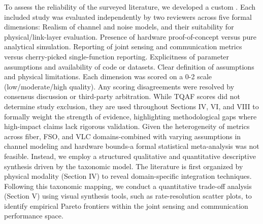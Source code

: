 {}
\markdownRendererSectionEnd \markdownRendererSectionBegin
{}\markdownRendererInterblockSeparator
{}To assess the reliability of the surveyed literature, we developed a custom . Each included study was evaluated independently by two reviewers across five formal dimensions:\markdownRendererInterblockSeparator
{}\markdownRendererOlBeginTight
{} Realism of channel and noise models, and their suitability for physical/link-layer evaluation.\markdownRendererOlItemEnd 
{} Presence of hardware proof-of-concept versus pure analytical simulation.\markdownRendererOlItemEnd 
{} Reporting of joint sensing and communication metrics versus cherry-picked single-function reporting.\markdownRendererOlItemEnd 
{} Explicitness of parameter assumptions and availability of code or datasets.\markdownRendererOlItemEnd 
{} Clear definition of assumptions and physical limitations.\markdownRendererOlItemEnd 
\markdownRendererOlEndTight \markdownRendererInterblockSeparator
{}Each dimension was scored on a 0-2 scale (low/moderate/high quality). Any scoring disagreements were resolved by consensus discussion or third-party arbitration. While TQAF scores did not determine study exclusion, they are used throughout Sections IV, VI, and VIII to formally weight the strength of evidence, highlighting methodological gaps where high-impact claims lack rigorous validation.\markdownRendererInterblockSeparator
{}
\markdownRendererSectionEnd \markdownRendererSectionBegin
{}\markdownRendererInterblockSeparator
{}Given the heterogeneity of metrics across fiber, FSO, and VLC domains-combined with varying assumptions in channel modeling and hardware bounds-a formal statistical meta-analysis was not feasible. Instead, we employ a structured qualitative and quantitative descriptive synthesis driven by the taxonomic model. The literature is first organized by physical modality (Section IV) to reveal domain-specific integration techniques. Following this taxonomic mapping, we conduct a quantitative trade-off analysis (Section V) using visual synthesis tools, such as rate-resolution scatter plots, to identify empirical Pareto frontiers within the joint sensing and communication performance space.\markdownRendererInterblockSeparator
